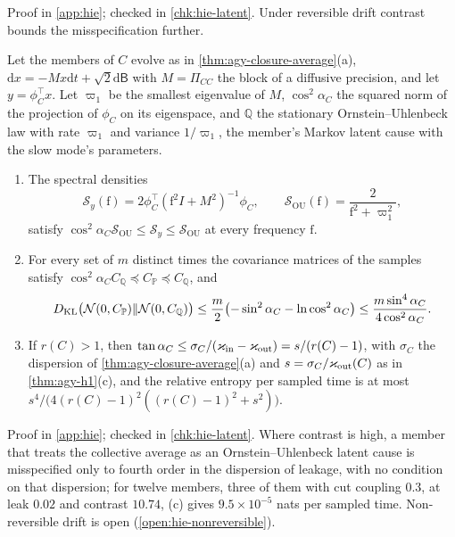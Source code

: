 Proof in \cref{app:hie}; checked in \cref{chk:hie-latent}. Under reversible drift contrast bounds the misspecification further.

\begin{proposition}\label{prop:hie-reversible-sandwich}
Let the members of $C$ evolve as in \cref{thm:agy-closure-average}(a), $\mathrm dx=-Mx\mathrm dt+\sqrt2\mathrm d\mathsf B$ with $M=\Pi_{CC}$ the block of a diffusive precision, and let $y=\phi_C^\top x$. Let $\varpi_1$ be the smallest eigenvalue of $M$, $\cos^2\alpha_C$ the squared norm of the projection of $\phi_C$ on its eigenspace, and $\mathbb Q$ the stationary Ornstein--Uhlenbeck law with rate $\varpi_1$ and variance $1/\varpi_1$, the member's Markov latent cause with the slow mode's parameters.
\begin{enumerate}
\item[(a)] The spectral densities
\[
\mathcal S_y(\mathrm f)=2\phi_C^\top(\mathrm f^2I+M^2)^{-1}\phi_C,\qquad\mathcal S_{\mathrm{OU}}(\mathrm f)=\frac2{\mathrm f^2+\varpi_1^2},
\]
satisfy $\cos^2\alpha_C\mathcal S_{\mathrm{OU}}\le\mathcal S_y\le\mathcal S_{\mathrm{OU}}$ at every frequency $\mathrm f$.
\item[(b)] For every set of $m$ distinct times the covariance matrices of the samples satisfy $\cos^2\alpha_C C_{\mathbb Q}\preceq C_{\mathbb P}\preceq C_{\mathbb Q}$, and
\begin{equation}\label{eq:hie-sandwich-kl}
D_{\mathrm{KL}}\bigl(\mathcal{N}(0,C_{\mathbb P})\Vert\mathcal{N}(0,C_{\mathbb Q})\bigr)\le\frac m2\bigl(-\sin^2\alpha_C-\ln\cos^2\alpha_C\bigr)\le\frac{m\sin^4\alpha_C}{4\cos^2\alpha_C}.
\end{equation}
\item[(c)] If $r(C)>1$, then $\tan\alpha_C\le\sigma_C/(\varkappa_{\mathrm{in}}-\varkappa_{\mathrm{out}})=s/(r(C)-1)$, with $\sigma_C$ the dispersion of \cref{thm:agy-closure-average}(a) and $s=\sigma_C/\varkappa_{\mathrm{out}}(C)$ as in \cref{thm:agy-h1}(c), and the relative entropy per sampled time is at most $s^4/\bigl(4(r(C)-1)^2((r(C)-1)^2+s^2)\bigr)$.
\end{enumerate}
\end{proposition}

Proof in \cref{app:hie}; checked in \cref{chk:hie-latent}. Where contrast is high, a member that treats the collective average as an Ornstein--Uhlenbeck latent cause is misspecified only to fourth order in the dispersion of leakage, with no condition on that dispersion; for twelve members, three of them with cut coupling $0.3$, at leak $0.02$ and contrast $10.74$, (c) gives $9.5\times10^{-5}$ nats per sampled time. Non-reversible drift is open (\cref{open:hie-nonreversible}).

